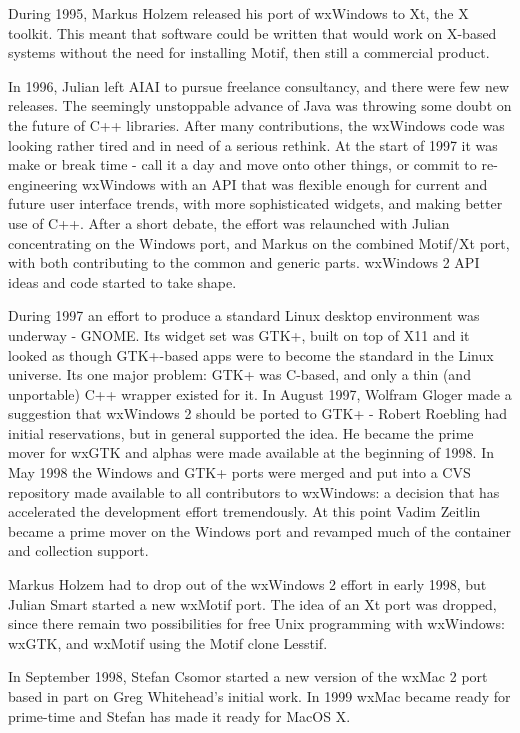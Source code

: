 During 1995, Markus Holzem released his port of wxWindows to Xt,
the X toolkit. This meant that software could be written that
would work on X-based systems without the need for installing Motif,
then still a commercial product.

In 1996, Julian left AIAI to pursue freelance consultancy, and
there were few new releases. The seemingly unstoppable advance
of Java was throwing some doubt on the future of C++ libraries.
After many contributions, the wxWindows code was looking rather
tired and in need of a serious rethink. At the start of 1997 it
was make or break time - call it a day and move onto other
things, or commit to re-engineering wxWindows with an API that
was flexible enough for current and future user interface
trends, with more sophisticated widgets, and making better use of C++.
After a short debate, the effort was relaunched
with Julian concentrating on the Windows port, and Markus on the combined Motif/Xt port,
with both contributing to the common and generic parts. wxWindows 2 API
ideas and code started to take shape.

During 1997 an effort to produce a standard Linux desktop
environment was underway - GNOME. Its widget set was GTK+, built
on top of X11 and it looked as though GTK+-based apps were to
become the standard in the Linux universe. Its one major problem:
GTK+ was C-based, and only a thin (and unportable) C++ wrapper
existed for it. In August 1997, Wolfram Gloger made a suggestion
that wxWindows 2 should be ported to GTK+ - Robert Roebling had
initial reservations, but in general supported the idea. He
became the prime mover for wxGTK and alphas were made available
at the beginning of 1998. In May 1998 the Windows and GTK+ ports
were merged and put into a CVS repository made available to all
contributors to wxWindows: a decision that has accelerated the development
effort tremendously. At this point Vadim Zeitlin became a prime
mover on the Windows port and revamped much of the container
and collection support.

Markus Holzem had to drop out of the wxWindows 2 effort in early
1998, but Julian Smart started a new wxMotif port. The idea of
an Xt port was dropped, since there remain two possibilities for
free Unix programming with wxWindows: wxGTK, and wxMotif using
the Motif clone Lesstif.

In September 1998, Stefan Csomor started a new version of the
wxMac 2 port based in part on Greg Whitehead's initial work.
In 1999 wxMac became ready for prime-time and Stefan has
made it ready for MacOS X.

